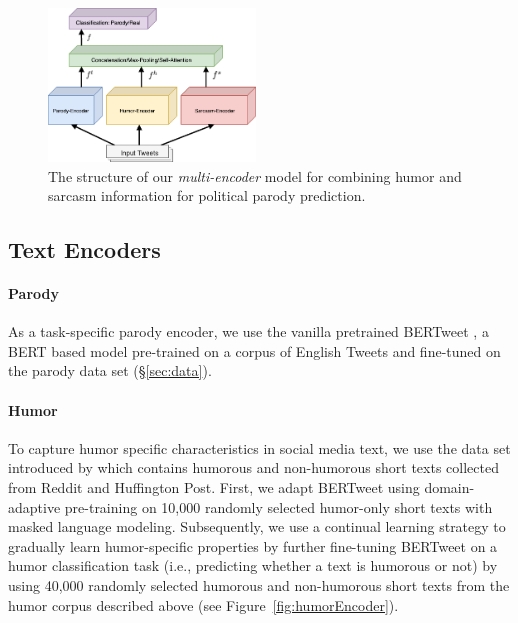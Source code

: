 \documentclass[11pt]{article}
\begin{document}
\begin{figure}[t!]
\centering
\includegraphics[width=5.5cm]{Model-Diagram_modified.png}
\caption{The structure of our \emph{multi-encoder} model for combining humor and sarcasm information for political parody prediction.}
\label{fig:model}
\end{figure}





\subsection{Text Encoders}

\paragraph{Parody}

As a task-specific parody encoder, we use the vanilla pretrained BERTweet \citep{nguyen-etal-2020-bertweet}, a BERT \cite{devlin-etal-2019-bert} based model pre-trained on a corpus of English Tweets and fine-tuned on the parody data set (\S \ref{sec:data}). %




\paragraph{Humor} 
To capture humor specific characteristics in social media text, we use the data set introduced by \citet{annamoradnejad2020colbert} which contains humorous and non-humorous short texts collected from Reddit and Huffington Post. First, we adapt BERTweet using domain-adaptive pre-training \citep{sun2020finetune,gururangan-etal-2020-dont} on 10,000 randomly selected humor-only short texts with masked language modeling. 
Subsequently, we use a continual learning strategy \citep{8107520,Sun_Wang_Li_Feng_Tian_Wu_Wang_2020} to gradually learn humor-specific properties by further fine-tuning BERTweet on a humor classification task (i.e., predicting whether a text is humorous or not) by using 40,000 randomly selected humorous and non-humorous short texts from the humor corpus described above (see Figure~\ref{fig:humorEncoder}).
\end{document}
